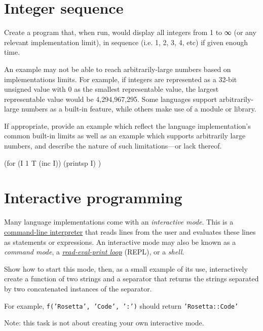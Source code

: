 \pagebreak{}
\section*{Integer sequence}

Create a program that, when run, would display all integers from 1 to ∞
(or any relevant implementation limit), in sequence (i.e. 1, 2, 3, 4,
etc) if given enough time.

An example may not be able to reach arbitrarily-large numbers based on
implementations limits. For example, if integers are represented as a
32-bit unsigned value with 0 as the smallest representable value, the
largest representable value would be 4,294,967,295. Some languages
support arbitrarily-large numbers as a built-in feature, while others
make use of a module or library.

If appropriate, provide an example which reflect the language
implementation's common built-in limits as well as an example which
supports arbitrarily large numbers, and describe the nature of such
limitations---or lack thereof.


\begin{wideverbatim}

(for (I 1 T (inc I))
   (printsp I) )

\end{wideverbatim}

\pagebreak{}
\section*{Interactive programming}

Many language implementations come with an \emph{interactive mode}.
This is a
\href{http://en.wikipedia.org/wiki/command-line\_interpreter}{command-line
  interpreter} that reads lines from the user and evaluates these
lines as statements or expressions. An interactive mode may also be
known as a \emph{command mode}, a
\emph{\href{http://en.wikipedia.org/wiki/read-eval-print\_loop}{read-eval-print
    loop}} (REPL), or a \emph{shell}.

Show how to start this mode, then, as a small example of its use,
interactively create a function of two strings and a separator that
returns the strings separated by two concatenated instances of the
separator.

For example, \texttt{f('Rosetta', 'Code', ':')} should return
\texttt{'Rosetta::Code'}

Note: this task is not about creating your own interactive mode.

